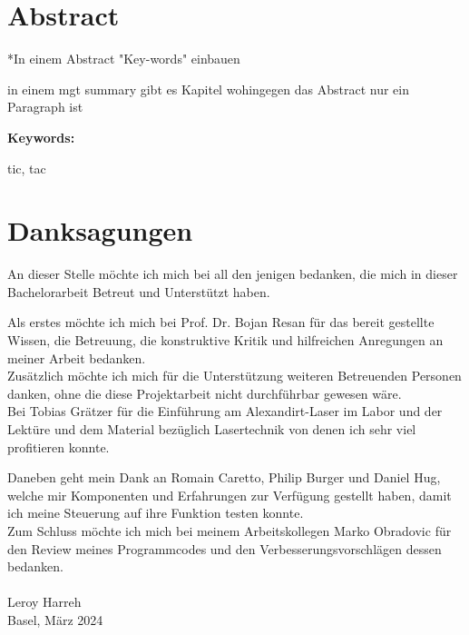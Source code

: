 \section*{Abstract}
*In einem Abstract "Key-words" einbauen

in einem mgt summary gibt es Kapitel wohingegen das Abstract nur ein Paragraph ist

\vspace{2ex}

\textbf{Keywords:}

tic, tac

\clearpage

\section*{Danksagungen}
An dieser Stelle möchte ich mich bei all den jenigen bedanken, die mich in dieser Bachelorarbeit Betreut und Unterstützt haben.

Als erstes möchte ich mich bei Prof. Dr. Bojan Resan für das bereit gestellte Wissen, die Betreuung, die konstruktive Kritik und hilfreichen Anregungen an meiner Arbeit bedanken.\\

Zusätzlich möchte ich mich für die Unterstützung weiteren Betreuenden Personen danken, ohne die diese Projektarbeit nicht durchführbar gewesen wäre.\\ Bei Tobias Grätzer für die Einführung am Alexandirt-Laser im Labor und der Lektüre und dem Material bezüglich Lasertechnik von denen ich sehr viel profitieren konnte.

Daneben geht mein Dank an Romain Caretto, Philip Burger und Daniel Hug, welche mir Komponenten und Erfahrungen zur Verfügung gestellt haben, damit ich meine Steuerung auf ihre Funktion testen konnte.\\

Zum Schluss möchte ich mich bei meinem Arbeitskollegen Marko Obradovic für den Review meines Programmcodes und den Verbesserungsvorschlägen dessen bedanken.
\\\\
Leroy Harreh\\
Basel, März 2024

